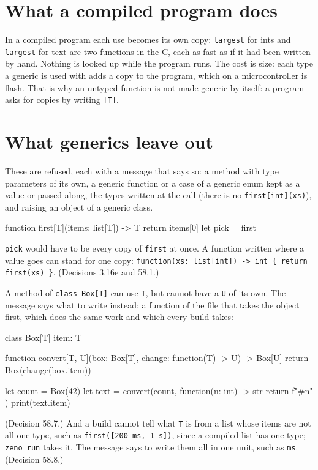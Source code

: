 \section{What a compiled program does}

In a compiled program each use becomes its own copy:
\verb|largest| for ints and \verb|largest| for text are two functions
in the C, each as fast as if it had been written by hand. Nothing is
looked up while the program runs. The cost is size: each type a
generic is used with adds a copy to the program, which on a
microcontroller is flash. That is why an untyped function is not made
generic by itself: a program asks for copies by writing \verb|[T]|.

\section{What generics leave out}

These are refused, each with a message that says so: a method with
type parameters of its own, a generic function or a case of a generic
enum kept as a value or passed along, the types written at the call
(there is no \verb|first[int](xs)|), and raising an object of a
generic class.

\begin{zeno}[fails=yes]
function first[T](items: list[T]) -> T {
    return items[0]
}
let pick = first
\end{zeno}

\verb|pick| would have to be every copy of \verb|first| at once. A
function written where a value goes can stand for one copy:
\verb|function(xs: list[int]) -> int { return first(xs) }|.
(Decisions 3.16e and 58.1.)

A method of \verb|class Box[T]| can use \verb|T|, but cannot have a
\verb|U| of its own. The message says what to write instead: a
function of the file that takes the object first, which does the same
work and which every build takes:

\begin{zeno}[file=boxes.zeno, dir=leave-out]
class Box[T] {
    item: T
}

function convert[T, U](box: Box[T], change: function(T) -> U) -> Box[U] {
    return Box(change(box.item))
}

let count = Box(42)
let text = convert(count, function(n: int) -> str { return f"#{n}" })
print(text.item)
\end{zeno}

(Decision 58.7.) And a build cannot tell what \verb|T| is from a list
whose items are not all one type, such as \verb|first([200 ms, 1 s])|,
since a compiled list has one type; \verb|zeno run| takes it. The
message says to write them all in one unit, such as \verb|ms|.
(Decision 58.8.)

